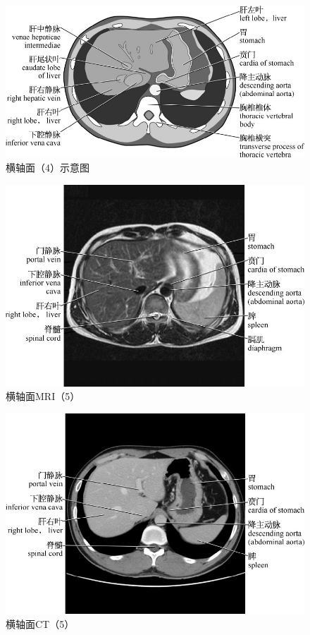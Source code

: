 \begin{figure}[!htbp]
 \centering
 \includegraphics{./images/Image00013.jpg}
 \captionsetup{justification=centering}
 \caption{横轴面（4）示意图}
  \end{figure} 
 \FloatBarrier

\begin{figure}[!htbp]
 \centering
 \includegraphics{./images/Image00014.jpg}
 \captionsetup{justification=centering}
 \caption{横轴面MRI（5）}
  \end{figure} 
 \FloatBarrier

\begin{figure}[!htbp]
 \centering
 \includegraphics{./images/Image00015.jpg}
 \captionsetup{justification=centering}
 \caption{横轴面CT（5）}
  \end{figure} 
 \FloatBarrier

